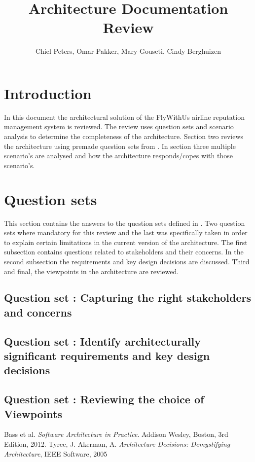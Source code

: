 \documentclass{article}
\begin{document}
\title{Architecture Documentation Review}
\author{Chiel Peters, Omar Pakker, Mary Gouseti, Cindy Berghuizen}
\maketitle
\setlength\parindent{0pt}
\newcommand{\blank}[1]{\hspace*{#1}}

\section{Introduction}

In this document the architectural solution of the FlyWithUs airline reputation management system is reviewed. The review uses question sets and scenario analysis to determine the completeness
of the architecture. Section two reviews the architecture using premade question sets from \cite{tyree}. In section three multiple scenario's are analysed and how the architecture responds/copes with those scenario's. 

\section{Question sets}

This section contains the answers to the question sets defined in \cite{tyree}. Two question sets where mandatory for this review and the last was specifically taken in order to explain certain limitations in the current version of
the architecture. The first subsection contains questions related to stakeholders and their concerns. In the second subsection the requirements and key design decisions are discussed. Third and final, the viewpoints in the architecture
are reviewed.

\subsection{Question set : Capturing the right stakeholders and concerns}


\newpage
\subsection{Question set : Identify architecturally significant requirements and key design decisions}


\newpage
\subsection{Question set : Reviewing the choice of Viewpoints}
\newpage


\begin{thebibliography}{9}
Bass et al.
  \emph{Software Architecture in Practice}.
  Addison Wesley, Boston,
  3rd Edition,
  2012.
Tyree, J.  Akerman, A. 
\emph{Architecture Decisions:
Demystifying Architecture},
IEEE Software,
2005

\end{thebibliography}
\end{document}
